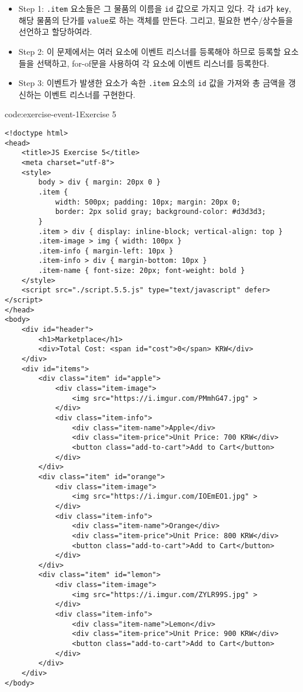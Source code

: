 \begin{itemize}
    \item Step 1: \texttt{.item} 요소들은 그 물품의 이름을 \texttt{id} 값으로 가지고 있다. 각 \texttt{id}가 \texttt{key}, 해당 물품의 단가를 \texttt{value}로 하는 객체를 만든다. 그리고, 필요한 변수/상수들을 선언하고 할당하여라.
    \item Step 2: 이 문제에서는 여러 요소에 이벤트 리스너를 등록해야 하므로 등록할 요소들을 선택하고, for-of문을 사용하여 각 요소에 이벤트 리스너를 등록한다.
    \item Step 3: 이벤트가 발생한 요소가 속한 \texttt{.item} 요소의 \texttt{id} 값을 가져와 총 금액을 갱신하는 이벤트 리스너를 구현한다.
\end{itemize}
\newpage

\begin{codeenv}{code:exercise-event-1}{Exercise 5}\begin{verbatim}
<!doctype html>
<head>
    <title>JS Exercise 5</title>
    <meta charset="utf-8">
    <style>
        body > div { margin: 20px 0 }
        .item { 
            width: 500px; padding: 10px; margin: 20px 0;
            border: 2px solid gray; background-color: #d3d3d3;
        }
        .item > div { display: inline-block; vertical-align: top }
        .item-image > img { width: 100px }
        .item-info { margin-left: 10px }
        .item-info > div { margin-bottom: 10px }
        .item-name { font-size: 20px; font-weight: bold }
    </style>
    <script src="./script.5.5.js" type="text/javascript" defer></script>
</head>
<body>
    <div id="header">
        <h1>Marketplace</h1>
        <div>Total Cost: <span id="cost">0</span> KRW</div>
    </div>
    <div id="items">
        <div class="item" id="apple">
            <div class="item-image">
                <img src="https://i.imgur.com/PMmhG47.jpg" >
            </div>
            <div class="item-info">
                <div class="item-name">Apple</div>
                <div class="item-price">Unit Price: 700 KRW</div>
                <button class="add-to-cart">Add to Cart</button>
            </div>
        </div>
        <div class="item" id="orange">
            <div class="item-image">
                <img src="https://i.imgur.com/IOEmEO1.jpg" >
            </div>
            <div class="item-info">
                <div class="item-name">Orange</div>
                <div class="item-price">Unit Price: 800 KRW</div>
                <button class="add-to-cart">Add to Cart</button>
            </div>
        </div>
        <div class="item" id="lemon">
            <div class="item-image">
                <img src="https://i.imgur.com/ZYLR99S.jpg" >
            </div>
            <div class="item-info">
                <div class="item-name">Lemon</div>
                <div class="item-price">Unit Price: 900 KRW</div>
                <button class="add-to-cart">Add to Cart</button>
            </div>
        </div>
    </div>
</body>
\end{verbatim}
\end{codeenv}

